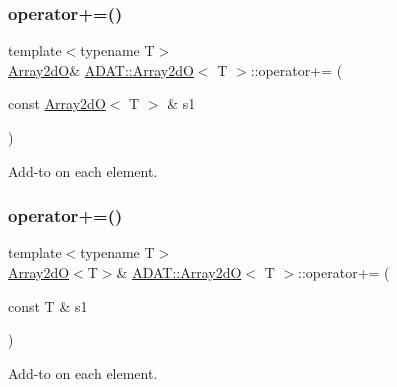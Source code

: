 \subsubsection{\texorpdfstring{operator+=()}{operator+=()}\hspace{0.1cm}{\footnotesize\ttfamily [3/6]}}
{\footnotesize\ttfamily template$<$typename T$>$ \\
\mbox{\hyperlink{classADAT_1_1Array2dO}{Array2dO}}\& \mbox{\hyperlink{classADAT_1_1Array2dO}{A\+D\+A\+T\+::\+Array2dO}}$<$ T $>$\+::operator+= (\begin{DoxyParamCaption}\item[{const \mbox{\hyperlink{classADAT_1_1Array2dO}{Array2dO}}$<$ T $>$ \&}]{s1 }\end{DoxyParamCaption})\hspace{0.3cm}{\ttfamily [inline]}}



Add-\/to on each element. 

\mbox{\label{classADAT_1_1Array2dO_ae36484e0516c671683a97079f32bd6d8}} 
\subsubsection{\texorpdfstring{operator+=()}{operator+=()}\hspace{0.1cm}{\footnotesize\ttfamily [4/6]}}
{\footnotesize\ttfamily template$<$typename T$>$ \\
\mbox{\hyperlink{classADAT_1_1Array2dO}{Array2dO}}$<$T$>$\& \mbox{\hyperlink{classADAT_1_1Array2dO}{A\+D\+A\+T\+::\+Array2dO}}$<$ T $>$\+::operator+= (\begin{DoxyParamCaption}\item[{const T \&}]{s1 }\end{DoxyParamCaption})\hspace{0.3cm}{\ttfamily [inline]}}



Add-\/to on each element. 

\mbox{\label{classADAT_1_1Array2dO_ae36484e0516c671683a97079f32bd6d8}} 
